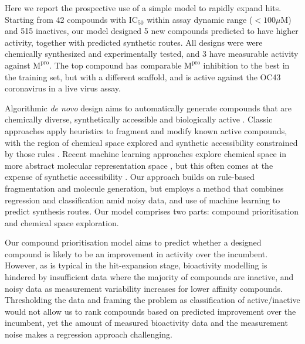 Here we report the prospective use of a simple model to rapidly expand hits. Starting from 42 compounds with $\mathrm{IC}_{50}$ within assay dynamic range ($<100 \mu$M) and 515 inactives, our model designed 5 new compounds predicted to have higher activity, together with predicted synthetic routes. All designs were were chemically synthesized and experimentally tested, and 3 have measurable activity against $\mathrm{M}^\mathrm{pro}$. The top compound has comparable $\mathrm{M}^\mathrm{pro}$ inhibition to the best in the training set, but with a different scaffold, and is active against the OC43 coronavirus in a live virus assay. 

Algorithmic \emph{de novo} design aims to automatically generate compounds that are chemically diverse, synthetically accessible and biologically active \cite{schneider2016novo}. Classic approaches apply heuristics to fragment and modify known active compounds, with the region of chemical space explored and synthetic accessibility constrained by those rules \cite{brown2004graph,patel2009knowledge,hartenfeller2012dogs}. Recent machine learning approaches explore chemical space in more abstract molecular representation space \cite{gomez2018automatic,segler2018generating}, but this often comes at the expense of synthetic accessibility \cite{Gao2020Synthesizability}. Our approach builds on rule-based fragmentation and molecule generation, but employs a method that combines regression and classification amid noisy data, and use of machine learning to predict synthesis routes. Our model comprises two parts: compound prioritisation and chemical space exploration. 

Our compound prioritisation model aims to predict whether a designed compound is likely to be an improvement in activity over the incumbent. However, as is typical in the hit-expansion stage, bioactivity modelling is hindered by insufficient data where the majority of compounds are inactive, and noisy data as measurement variability increases for lower affinity compounds. Thresholding the data and framing the problem as classification of active/inactive would not allow us to rank compounds based on predicted improvement over the incumbent, yet the amount of measured bioactivity data and the measurement noise makes a regression approach challenging.




